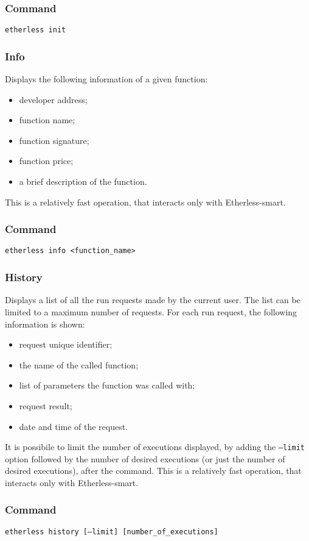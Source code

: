 	\subsubsection*{Command}
	\texttt{etherless init}
	\subsubsection{Info}
	Displays the following information of a given function:
	\begin{itemize}
		\item developer address;
		\item function name;
		\item function signature;
		\item function price;
		\item a brief description of the function.
	\end{itemize}
	This is a relatively fast operation, that interacts only with Etherless-smart.
	\subsubsection*{Command}
	\texttt{etherless info <function\_name>}
	\subsubsection{History}
	Displays a list of all the run requests made by the current user. The list can be limited to a maximum number of requests. For each run request, the following information is shown:
	\begin{itemize}
		\item request unique identifier;
		\item the name of the called function;
		\item list of parameters the function was called with;
		\item request result;
		\item date and time of the request.
	\end{itemize}
	It is possibile to limit the number of executions displayed, by adding the \texttt{---limit} option followed by the number of desired executions (or just the number of desired executions), after the command.
	This is a relatively fast operation, that interacts only with Etherless-smart.
	\subsubsection*{Command}
	\texttt{etherless history [---limit] [number\_of\_executions]}
